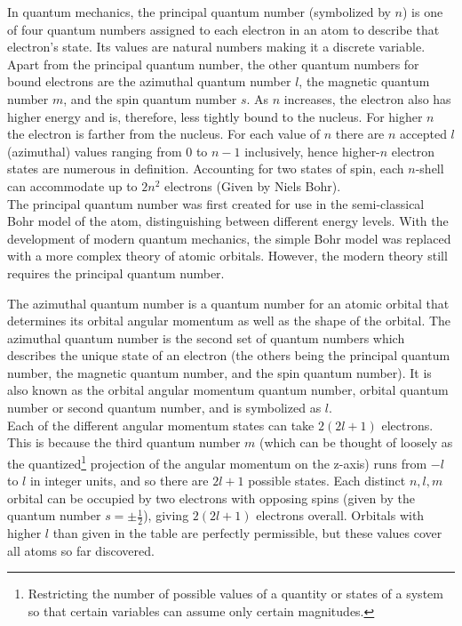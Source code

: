 \begin{chembox}{}
{In quantum mechanics, the principal quantum number (symbolized by $n$) is one of four quantum numbers assigned to each electron in an atom to describe that electron's state. Its values are natural numbers making it a discrete variable.\\
Apart from the principal quantum number, the other quantum numbers for bound electrons are the azimuthal quantum number $l$, the magnetic quantum number $m$, and the spin quantum number $s$.
As $n$ increases, the electron also has higher energy and is, therefore, less tightly bound to the nucleus. For higher $n$ the electron is farther from the nucleus. For each value of $n$ there are $n$ accepted $l$ (azimuthal) values ranging from $0$ to $n − 1$ inclusively, hence higher-$n$ electron states are numerous in definition. Accounting for two states of spin, each $n$-shell can accommodate up to $2n^2$ electrons (Given by Niels Bohr).\\
The principal quantum number was first created for use in the semi-classical Bohr model of the atom, distinguishing between different energy levels. With the development of modern quantum mechanics, the simple Bohr model was replaced with a more complex theory of atomic orbitals. However, the modern theory still requires the principal quantum number.}
\end{chembox}
\begin{chembox}{}
{The azimuthal quantum number is a quantum number for an atomic orbital that determines its orbital angular momentum as well as the shape of the orbital. The azimuthal quantum number is the second set of quantum numbers which describes the unique state of an electron (the others being the principal quantum number, the magnetic quantum number, and the spin quantum number). It is also known as the orbital angular momentum quantum number, orbital quantum number or second quantum number, and is symbolized as $l$.\\
Each of the different angular momentum states can take $2(2l + 1)$ electrons. This is because the third quantum number $m$ (which can be thought of loosely as the quantized\footnote{Restricting the number of possible values of a quantity or states of a system so that certain variables can assume only certain magnitudes.} projection of the angular momentum on the z-axis) runs from $−l$ to $l$ in integer units, and so there are $2l + 1$ possible states. Each distinct $n, l, m$ orbital can be occupied by two electrons with opposing spins (given by the quantum number $s = \pm \frac{1}{2}$), giving $2(2l + 1)$ electrons overall. Orbitals with higher $l$ than given in the table are perfectly permissible, but these values cover all atoms so far discovered.}
\end{chembox}
